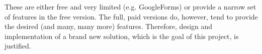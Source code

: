 These are either free and very limited (e.g. GoogleForms) or provide a narrow set of features in the free version. The full, paid versions do, however, tend to provide the desired (and many, many more) features. Therefore, design and implementation of a brand new solution, which is the goal of this project, is justified.